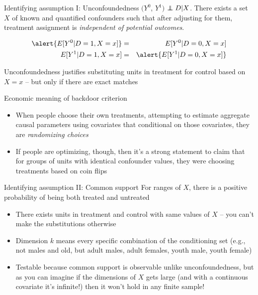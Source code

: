 \documentclass{beamer}
\newcommand\independent{\protect\mathpalette{\protect\independenT}{\perp}}
\def\independenT#1#2{\mathrel{\rlap{$#1#2$}\mkern2mu{#1#2}}}
\begin{document}
\begin{frame}[plain]

	\begin{block}{Identifying assumption I: Unconfoundedness}
	$(Y^0$, $Y^1)$ $\independent{D} | X$. There exists a set $X$ of known and quantified confounders such that after adjusting for them, treatment assignment is \emph{independent of potential outcomes}.
	\end{block}
	
	\begin{eqnarray*}
	\alert{E[Y^0 | D=1, X=x]} &=& E[Y^0 | D=0, X=x] \\
	E[Y^1 | D=1, X=x] &=& \alert{E[Y^1 | D=0, X=x] }
	\end{eqnarray*}
	
Unconfoundedness justifies substituting units in treatment for control based on $X=x$ -- but only if there are exact matches
	
	
\end{frame}

\begin{frame}{Economic meaning of backdoor criterion}

\begin{itemize}
\item When people choose their own treatments, attempting to estimate aggregate causal parameters using covariates that conditional on those covariates, they are \emph{randomizing choices}
\item If people are optimizing, though, then it's a strong statement to claim that for groups of units with identical confounder values, they were choosing treatments based on coin flips
\end{itemize}

\end{frame}




\begin{frame}[plain]

	\begin{block}{Identifying assumption II: Common support}
	For ranges of $X$, there is a positive probability of being both treated and untreated
	\end{block}
	
	\begin{itemize}
	\item There exists units in treatment and control with same values of $X$ -- you can't make the substitutions otherwise
	\item Dimension $k$ means every specific combination of the conditioning set (e.g., not males and old, but adult males, adult females, youth male, youth female)
	\item Testable because common support is observable unlike unconfoundedness, but as you can imagine if the dimensions of $X$ gets large (and with a continuous covariate it's infinite!) then it won't hold in any finite sample!
	\end{itemize}
	
	
\end{frame}
\end{document}

